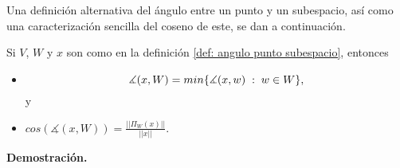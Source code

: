 Una definición alternativa del ángulo entre un punto y un subespacio,
así como una caracterización sencilla del coseno de este,
se dan a continuación.

\begin{prop}
\label{prop: algunos hechos sobre el angulo entre un vector y un subespacio}
Si $V$, $W$ y $x$ son como en la definición 
\ref{def: angulo punto subespacio}, entonces

\begin{itemize}
\item \[
\measuredangle (x, W) = min \{ \measuredangle(x,w) \hspace{0.1cm} :
 \hspace{0.1cm} w \in W \},
\]
y 

\item $cos \left( \measuredangle (x, W) \right) = \frac{|| \Pi_{W}(x) ||}{||x||}$.
\end{itemize}


\end{prop}
\noindent
\textbf{Demostración.}
